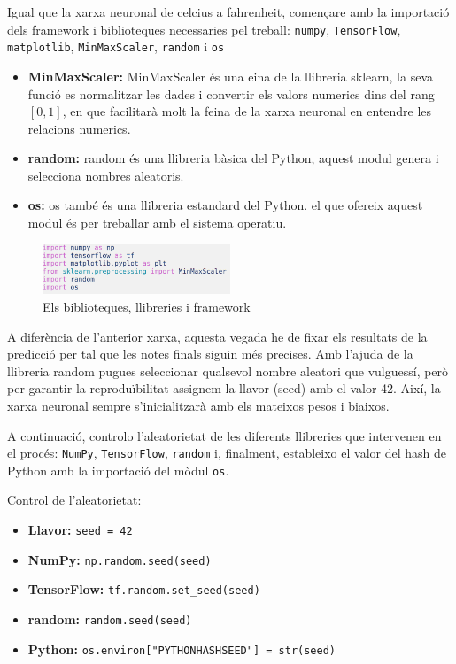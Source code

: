 Igual que la xarxa neuronal de celcius a fahrenheit, començare amb la importació dels framework i biblioteques necessaries pel treball: \texttt{numpy}, \texttt{TensorFlow}, \texttt{matplotlib}, \texttt{MinMaxScaler}, \texttt{random} i \texttt{os}

\begin{itemize}
 \item \textbf{MinMaxScaler: } MinMaxScaler és una eina de la llibreria sklearn, la seva funció es normalitzar les dades i convertir els valors numerics dins del rang $[0,1]$, en que facilitarà molt la feina de la xarxa neuronal en entendre les relacions numerics.
 \item \textbf{random: } random és una llibreria bàsica del Python, aquest modul genera i selecciona nombres aleatoris.
 \item \textbf{os: } os també és una llibreria estandard del Python. el que ofereix aquest modul és per treballar amb el sistema operatiu.
\end{itemize}

\begin{figure}[H]
    \centering
    \includegraphics[width=0.5\textwidth]{./figures/21.png}
    \caption{Els biblioteques, llibreries i framework}
\end{figure}

A diferència de l’anterior xarxa, aquesta vegada he de fixar els resultats de la predicció per tal que les notes finals siguin més precises. Amb l’ajuda de la llibreria random pugues seleccionar qualsevol nombre aleatori que vulguessí, però per garantir la reproduïbilitat assignem la llavor (seed) amb el valor 42. Així, la xarxa neuronal sempre s’inicialitzarà amb els mateixos pesos i biaixos.

A continuació, controlo l’aleatorietat de les diferents llibreries que intervenen en el procés: \texttt{NumPy}, \texttt{TensorFlow}, \texttt{random} i, finalment, estableixo el valor del hash de Python amb la importació del mòdul \texttt{os}.

Control de l’aleatorietat:
\begin{itemize}
\item \textbf{Llavor:} \texttt{seed = 42}
\item \textbf{NumPy:} \texttt{np.random.seed(seed)}
\item \textbf{TensorFlow:} \texttt{tf.random.set\_seed(seed)}
\item \textbf{random:} \texttt{random.seed(seed)}
\item \textbf{Python:} \texttt{os.environ["PYTHONHASHSEED"] = str(seed)}
\end{itemize}

